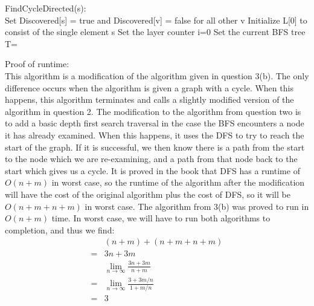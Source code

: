 \documentclass{assignment}
\begin{document}
\begin{problemlist}
\begin{answer}
\begin{algorithm}
  FindCycleDirected(s):{\\
    Set Discovered[s] = true and Discovered[v] = false for all other v\;
    Initialize L[0] to consist of the single element s\;
    Set the layer counter i=0\;
    Set the current BFS tree T=\null\;
  }
\end{algorithm}
Proof of runtime:\\
This algorithm is a modification of the algorithm given in question 3(b). The only difference occurs when the algorithm is given a graph with a cycle. When this happens, this algorithm terminates and calls a slightly modified version of the algorithm in question 2. The modification to the algorithm from question two is to add a basic depth first search traversal in the case the BFS encounters a node it has already examined. When this happens, it uses the DFS to try to reach the start of the graph. If it is successful, we then know there is a path from the start to the node which we are re-examining, and a path from that node back to the start which gives us a cycle. It is proved in the book that DFS has a runtime of $O(n+m)$ in worst case, so the runtime of the algorithm after the modification will have the cost of the original algorithm plus the cost of DFS, so it will be $O(n+m+n+m)$ in worst case. The algorithm from 3(b) was proved to run in $O(n+m)$ time. In worst case, we will have to run both algorithms to completion, and thus we find:
\begin{align*}
&(n+m) + (n+m+n+m)\\
=&3n + 3m\\
&\lim_{n\rightarrow \infty} \frac{3n+3m}{n+m}\\
=&\lim_{n\rightarrow \infty} \frac{3+3m/n}{1+m/n}\\
=&3\\

\end{align*}
\end{answer}
\end{problemlist}
\end{document}
